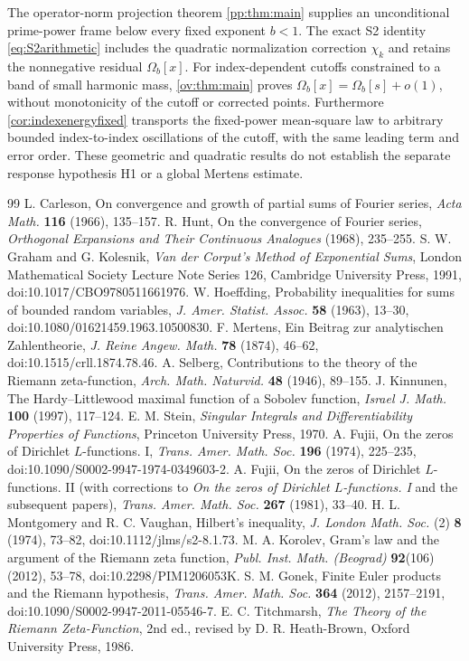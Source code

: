\documentclass[11pt,reqno]{amsart}
\numberwithin{equation}{section}
\begin{document}
The operator-norm projection theorem \cref{pp:thm:main} supplies an
unconditional prime-power frame below every fixed exponent $b<1$.
The exact S2 identity \eqref{eq:S2arithmetic} includes the quadratic
normalization correction $\chi_k$ and retains the nonnegative residual
$\Omega_b[x]$. For index-dependent cutoffs constrained to a band of
small harmonic mass, \cref{ov:thm:main} proves
$\Omega_b[x]=\Omega_b[s]+o(1)$, without monotonicity of the cutoff
or corrected points. Furthermore \cref{cor:indexenergyfixed} transports
the fixed-power mean-square law to arbitrary bounded index-to-index
oscillations of the cutoff, with the same leading term and error order.
These geometric and quadratic results do not establish the separate
response hypothesis H1 or a global Mertens estimate.

\begin{thebibliography}{99}
 L. Carleson, On convergence and growth of partial sums of Fourier series, \emph{Acta Math.} \textbf{116} (1966), 135--157.
 R. Hunt, On the convergence of Fourier series, \emph{Orthogonal Expansions and Their Continuous Analogues} (1968), 235--255.
S. W. Graham and G. Kolesnik, \emph{Van der Corput's Method of Exponential Sums},
London Mathematical Society Lecture Note Series 126, Cambridge University Press, 1991,
doi:10.1017/CBO9780511661976.
W. Hoeffding, Probability inequalities for sums of bounded random variables,
\emph{J. Amer. Statist. Assoc.} \textbf{58} (1963), 13--30,
doi:10.1080/01621459.1963.10500830.
F. Mertens, Ein Beitrag zur analytischen Zahlentheorie,
\emph{J. Reine Angew. Math.} \textbf{78} (1874), 46--62,
doi:10.1515/crll.1874.78.46.
A. Selberg, Contributions to the theory of the Riemann zeta-function,
\emph{Arch. Math. Naturvid.} \textbf{48} (1946), 89--155.
J. Kinnunen, The Hardy--Littlewood maximal function of a Sobolev function,
\emph{Israel J. Math.} \textbf{100} (1997), 117--124.
E. M. Stein, \emph{Singular Integrals and Differentiability Properties of Functions},
Princeton University Press, 1970.
 A. Fujii, On the zeros of Dirichlet $L$-functions. I, \emph{Trans. Amer. Math. Soc.} \textbf{196} (1974), 225--235, doi:10.1090/S0002-9947-1974-0349603-2.
 A. Fujii, On the zeros of Dirichlet $L$-functions. II (with corrections to \emph{On the zeros of Dirichlet $L$-functions. I} and the subsequent papers), \emph{Trans. Amer. Math. Soc.} \textbf{267} (1981), 33--40.
 H. L. Montgomery and R. C. Vaughan, Hilbert's inequality, \emph{J. London Math. Soc.} (2) \textbf{8} (1974), 73--82, doi:10.1112/jlms/s2-8.1.73.
 M. A. Korolev, Gram's law and the argument of the Riemann zeta function, \emph{Publ. Inst. Math. (Beograd)} \textbf{92}(106) (2012), 53--78, doi:10.2298/PIM1206053K.
 S. M. Gonek, Finite Euler products and the Riemann hypothesis, \emph{Trans. Amer. Math. Soc.} \textbf{364} (2012), 2157--2191, doi:10.1090/S0002-9947-2011-05546-7.
 E. C. Titchmarsh, \emph{The Theory of the Riemann Zeta-Function}, 2nd ed., revised by D. R. Heath-Brown, Oxford University Press, 1986.
\end{thebibliography}
\end{document}
